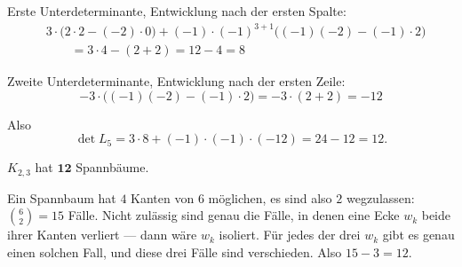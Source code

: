 \begin{aufgabe}
Erste Unterdeterminante, Entwicklung nach der ersten Spalte:
\begin{align*}
&3\cdot\bigl(2\cdot 2 - (-2)\cdot 0\bigr) + (-1)\cdot(-1)^{3+1}\bigl((-1)(-2) - (-1)\cdot 2\bigr)\\
&\qquad = 3\cdot 4 - (2 + 2) = 12 - 4 = 8
\end{align*}

Zweite Unterdeterminante, Entwicklung nach der ersten Zeile:
\[ -3 \cdot \bigl((-1)(-2) - (-1)\cdot 2\bigr) = -3 \cdot (2+2) = -12 \]

Also
\[ \det L_5 = 3 \cdot 8 + (-1)\cdot(-1)\cdot(-12) = 24 - 12 = 12 . \]

$K_{2,3}$ hat $\mathbf{12}$ Spannbäume.

Ein Spannbaum hat $4$ Kanten von $6$ möglichen, es sind also $2$ wegzulassen: $\binom{6}{2} = 15$ Fälle. Nicht zulässig sind genau die Fälle, in denen eine Ecke $w_k$ beide ihrer Kanten verliert --- dann wäre $w_k$ isoliert. Für jedes der drei $w_k$ gibt es genau einen solchen Fall, und diese drei Fälle sind verschieden. Also $15 - 3 = 12$. \checkmark

\begin{center}
\begin{minipage}{0.86\textwidth}
\end{minipage}
\end{center}
\end{aufgabe}

